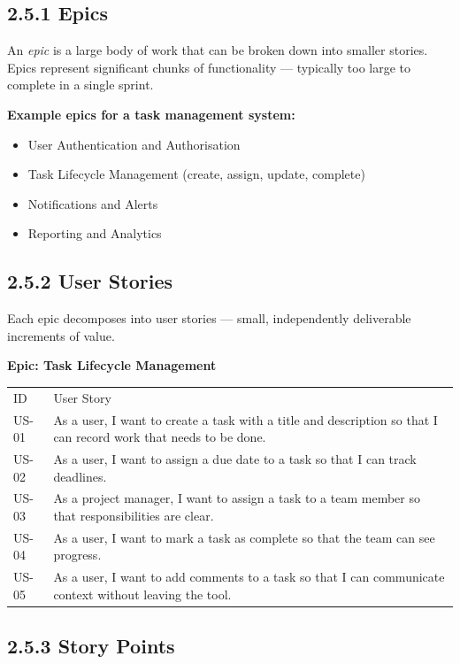 \documentclass[11pt,a4paper]{book}
\begin{document}
\subsection{2.5.1 Epics}

An \textit{epic} is a large body of work that can be broken down into smaller stories. Epics represent significant chunks of functionality --- typically too large to complete in a single sprint.

\textbf{Example epics for a task management system:}

\begin{itemize}
  \item User Authentication and Authorisation
  \item Task Lifecycle Management (create, assign, update, complete)
  \item Notifications and Alerts
  \item Reporting and Analytics
\end{itemize}

\subsection{2.5.2 User Stories}

Each epic decomposes into user stories --- small, independently deliverable increments of value.

\textbf{Epic: Task Lifecycle Management}

\begin{tabular}{ll}
\hline
ID & User Story \\
US-01 & As a user, I want to create a task with a title and description so that I can record work that needs to be done. \\
US-02 & As a user, I want to assign a due date to a task so that I can track deadlines. \\
US-03 & As a project manager, I want to assign a task to a team member so that responsibilities are clear. \\
US-04 & As a user, I want to mark a task as complete so that the team can see progress. \\
US-05 & As a user, I want to add comments to a task so that I can communicate context without leaving the tool. \\
\hline
\end{tabular}

\subsection{2.5.3 Story Points}
\end{document}
